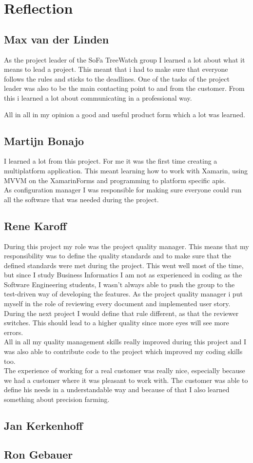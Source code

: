 \section{Reflection}
\subsection{Max van der Linden}
As the project leader of the SoFa TreeWatch group I learned a lot about what it means to lead a project. This meant that i had to make sure that everyone follows the rules and sticks to the deadlines. One of the tasks of the project leader was also to be the main contacting point to and from the customer. From this i learned a lot about communicating in a professional way.

All in all in my opinion a good and useful product form which a lot was learned.

\subsection{Martijn Bonajo}

I learned a lot from this project. For me it was the first time creating a multiplatform application. This meant learning how to work with Xamarin, using MVVM on the \gls{XamarinForms} and programming to platform specific \gls{api}s.\\
As configuration manager I was responsible for making sure everyone could run all the software that was needed during the project.

\subsection{Rene Karoff}
During this project my role was the project quality manager. This means that my responsibility was to define the quality standards and to make sure that the defined standards were met during the project. This went well most of the time, but since I study Business Informatics I am not as experienced in coding as the Software Engineering students, I wasn't always able to push the group to the test-driven way of developing the features. As the project quality manager i put myself in the role of reviewing every document and implemented user story. During the next project I would define that rule different, as that the reviewer switches. This should lead to a higher quality since more eyes will see more errors. \\
All in all my quality management skills really improved during this project and I was also able to contribute code to the project which improved my coding skills too.\\
The experience of working for a real customer was really nice, especially because we had a customer where it was pleasant to work with. The customer was able to define his needs in a understandable way and because of that I also learned something about precision farming.
\subsection{Jan Kerkenhoff}


\subsection{Ron Gebauer}
